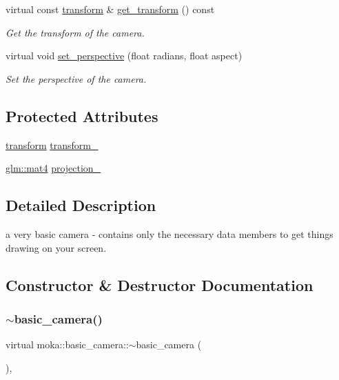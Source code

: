 \begin{DoxyCompactItemize}
virtual const \mbox{\hyperlink{classmoka_1_1transform}{transform}} \& \mbox{\hyperlink{classmoka_1_1basic__camera_a44867c4b5f360a4924350b66bdf387a9}{get\+\_\+transform}} () const
\begin{DoxyCompactList}\small\item\em Get the transform of the camera. \end{DoxyCompactList}\item 
virtual void \mbox{\hyperlink{classmoka_1_1basic__camera_aa396c162b5705bcdc3a02006c529d932}{set\+\_\+perspective}} (float radians, float aspect)
\begin{DoxyCompactList}\small\item\em Set the perspective of the camera. \end{DoxyCompactList}\end{DoxyCompactItemize}
\subsection*{Protected Attributes}
\begin{DoxyCompactItemize}
\item 
\mbox{\hyperlink{classmoka_1_1transform}{transform}} \mbox{\hyperlink{classmoka_1_1basic__camera_a06bb674f79f4448a3980cb94c88bf0cb}{transform\+\_\+}}
\item 
\mbox{\hyperlink{namespacemoka_aed2224bc0e5b79e57a8975ded94ee1aaabe14b41eb96410ea28b32bc138d885ae}{glm\+::mat4}} \mbox{\hyperlink{classmoka_1_1basic__camera_a6726e56b0b8b2279c948e5f94a0ace05}{projection\+\_\+}}
\end{DoxyCompactItemize}


\subsection{Detailed Description}
a very basic camera -\/ contains only the necessary data members to get things drawing on your screen. 

\subsection{Constructor \& Destructor Documentation}
\mbox{\label{classmoka_1_1basic__camera_a1b7c245be603c3623e54583aebe12357}} 
\subsubsection{\texorpdfstring{$\sim$basic\_camera()}{~basic\_camera()}}
{\footnotesize\ttfamily virtual moka\+::basic\+\_\+camera\+::$\sim$basic\+\_\+camera (\begin{DoxyParamCaption}{ }\end{DoxyParamCaption})\hspace{0.3cm}{\ttfamily [virtual]}, {\ttfamily [default]}}

